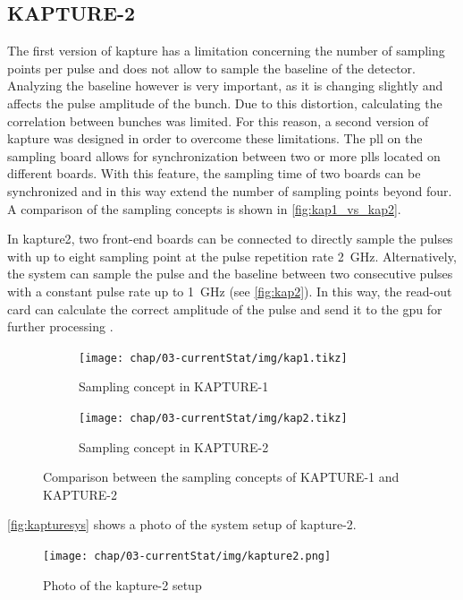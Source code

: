 \subsection{KAPTURE-2}
The first version of \gls{kapture} has a limitation concerning the number of sampling points per pulse and does not allow to sample the baseline of the detector.
Analyzing the baseline however is very important, as it is changing slightly and affects the pulse amplitude of the bunch. 
Due to this distortion, calculating the correlation between bunches was limited. 
For this reason, a second version of \gls{kapture} was designed in order to overcome these limitations. 
The \gls{pll} on the sampling board allows for synchronization between two or more \glspl{pll} located on different boards.
With this feature, the sampling time of two boards can be synchronized and in this way extend the number of sampling points beyond four.
A comparison of the sampling concepts is shown in \autoref{fig:kap1_vs_kap2}.

In \gls{kapture2}, two front-end boards can be connected to directly sample the pulses with up to eight sampling point at the pulse repetition rate \SI{2}{\GHz}. 
Alternatively, the system can sample the pulse and the baseline between two consecutive pulses with a constant pulse rate up to \SI{1}{\GHz} (see \autoref{fig:kap2}).
In this way, the read-out card can calculate the correct amplitude of the pulse and send it to the \gls{gpu} for further processing \cite{caselleKAP}.

\begin{figure}[tbh]
	\centering
	\begin{subfigure}{0.48\textwidth}
		\centering
		\texttt{[image: chap/03-currentStat/img/kap1.tikz]}  
		\caption{Sampling concept in KAPTURE-1}
		\label{fig:kap1}
	\end{subfigure}
	\hfill
	\begin{subfigure}{0.48\textwidth}
		\centering
		\texttt{[image: chap/03-currentStat/img/kap2.tikz]}  
		\caption{Sampling concept in KAPTURE-2}
		\label{fig:kap2}
	\end{subfigure}
	\caption[Comparison between KAPTURE-1 and KAPTURE-2]{Comparison between the sampling concepts of KAPTURE-1 and KAPTURE-2}
	\label{fig:kap1_vs_kap2}
\end{figure}


\autoref{fig:kapturesys} shows a photo of the system setup of \gls{kapture}-2.

\begin{figure}[tbh]
	\centering
	\texttt{[image: chap/03-currentStat/img/kapture2.png]}
	\caption[Photo of KAPTURE-2 system]{Photo of the \gls{kapture}-2 setup}
	\label{fig:kapturesys}
\end{figure}



